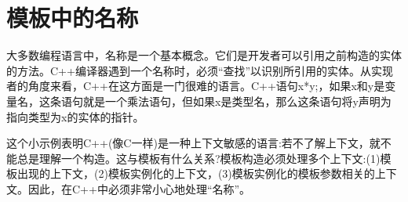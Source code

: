 \chapter{模板中的名称}
大多数编程语言中，名称是一个基本概念。它们是开发者可以引用之前构造的实体的方法。C++编译器遇到一个名称时，必须“查找”以识别所引用的实体。从实现者的角度来看，C++在这方面是一门很难的语言。C++语句x*y;，如果x和y是变量名，这条语句就是一个乘法语句，但如果x是类型名，那么这条语句将y声明为指向类型为x的实体的指针。

这个小示例表明C++(像C一样)是一种上下文敏感的语言:若不了解上下文，就不能总是理解一个构造。这与模板有什么关系?模板构造必须处理多个上下文:(1)模板出现的上下文，(2)模板实例化的上下文，(3)模板实例化的模板参数相关的上下文。因此，在C++中必须非常小心地处理“名称”。




